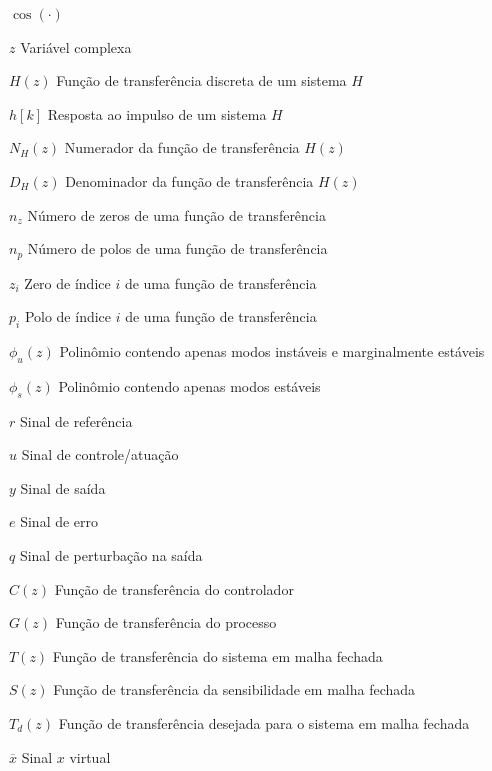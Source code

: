 \documentclass[repeatfields,oneside]{tcc}
\begin{document}
\begin{listofsymbols}{$ \cos(\cdot) $}
    \item[$ z $] Variável complexa
    \item[$ H(z) $] Função de transferência discreta de um sistema $H$
    \item[$ h {[k]} $] Resposta ao impulso de um sistema $H$

    \item[$ N_H(z) $] Numerador da função de transferência $H(z)$
    \item[$ D_H(z) $] Denominador da função de transferência $H(z)$

    \item[$ n_z $] Número de zeros de uma função de transferência
    \item[$ n_p $] Número de polos de uma função de transferência

    \item[$ z_i $] Zero de índice $i$ de uma função de transferência
    \item[$ p_i $] Polo de índice $i$ de uma função de transferência

    \item[$ \phi_u(z) $] Polinômio contendo apenas modos instáveis e marginalmente estáveis
    \item[$ \phi_s(z) $] Polinômio contendo apenas modos estáveis


    \item[$ r $] Sinal de referência
    \item[$ u $] Sinal de controle\slash{}atuação
    \item[$ y $] Sinal de saída
    \item[$ e $] Sinal de erro
    \item[$ q $] Sinal de perturbação na saída

    \item[$ C(z) $] Função de transferência do controlador
    \item[$ G(z) $] Função de transferência do processo
    \item[$ T(z) $] Função de transferência do sistema em malha fechada
    \item[$ S(z) $] Função de transferência da sensibilidade em malha fechada

    \item[$ T_d(z) $] Função de transferência desejada para o sistema em malha fechada

    \item[$ \overline{x} $] Sinal $x$ virtual


\end{listofsymbols}
\end{document}
